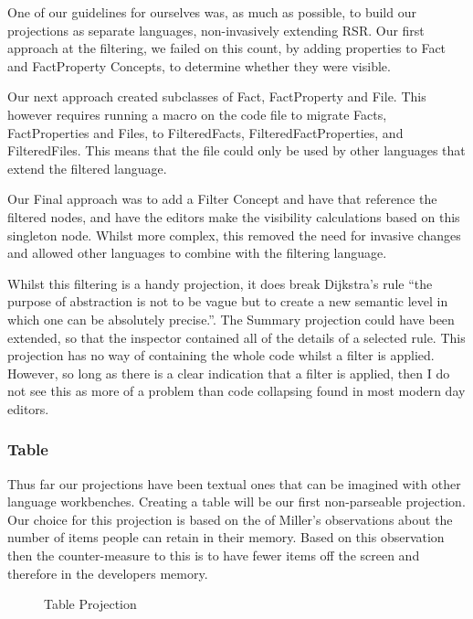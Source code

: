 One of our guidelines for ourselves was, as much as possible, to build our projections as separate languages, non-invasively extending RSR.
Our first approach at the filtering, we failed on this count, by adding properties to Fact and FactProperty Concepts, to determine whether they were visible.

Our next approach created subclasses of Fact, FactProperty and File.
This however requires running a macro on the code file to migrate Facts, FactProperties and Files, to FilteredFacts, FilteredFactProperties, and FilteredFiles.
This means that the file could only be used by other languages that extend the filtered language.

Our Final approach was to add a Filter Concept and have that reference the filtered nodes, and have the editors make the visibility calculations based on this singleton node.
Whilst more complex, this removed the need for invasive changes and allowed other languages to combine with the filtering language.

Whilst this filtering is a handy projection, it does break Dijkstra's rule ``the purpose of abstraction is not to be vague but to create a new semantic level in which one can be absolutely precise.''\cite{dijkstra1972humble}.
The Summary projection could have been extended, so that the inspector contained all of the details of a selected rule.
This projection has no way of containing the whole code whilst a filter is applied.
However, so long as there is a clear indication that a filter is applied, then I do not see this as more of a problem than code collapsing found in most modern day editors.

\subsubsection{Table}
Thus far our projections have been textual ones that can be imagined with other language workbenches.
Creating a table will be our first non-parseable projection.
Our choice for this projection is based on the of Miller's\cite{miller1956magical} observations about the number of items people can retain in their memory.
Based on this observation then the counter-measure to this is to have fewer items off the screen and therefore in the developers memory.

\begin{figure}[h]
    \centering
    \caption{Table Projection}
    \label{fig:tableProjection1}
\end{figure}

